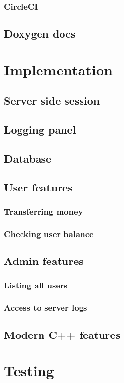 \documentclass[a4paper,12pt]{article}
\begin{document}
\subsubsection{CircleCI}
\subsection{Doxygen docs}

\section{Implementation}
\subsection{Server side session}
\subsection{Logging panel}
\subsection{Database}
\subsection{User features}
\subsubsection{Transferring money}
\subsubsection{Checking user balance}
\subsection{Admin features}
\subsubsection{Listing all users}
\subsubsection{Access to server logs}
\subsection{Modern C++ features}

\section{Testing}
\end{document}
